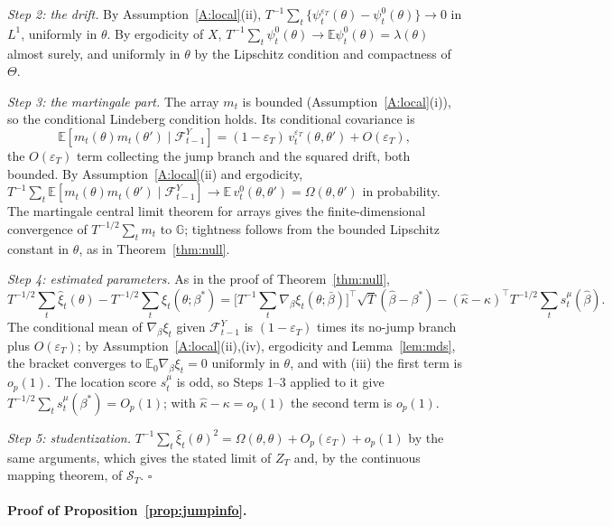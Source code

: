 \documentclass[11pt,a4paper]{article}
\theoremstyle{definition}
\theoremstyle{remark}
\newcommand{\E}{\mathbb{E}}
\newcommand{\F}{\mathcal{F}}
\newcommand{\tr}{^{\top}}
\begin{document}
\emph{Step 2: the drift.} By Assumption~\ref{A:local}(ii), $T^{-1}\sum_t\{\psi^{\varepsilon_T}_t(\theta)-\psi^0_t(\theta)\}\to0$ in $L^1$, uniformly in $\theta$. By ergodicity of $X$, $T^{-1}\sum_t\psi^0_t(\theta)\to\E\psi^0_t(\theta)=\lambda(\theta)$ almost surely, and uniformly in $\theta$ by the Lipschitz condition and compactness of $\Theta$.

\emph{Step 3: the martingale part.} The array $m_t$ is bounded (Assumption~\ref{A:local}(i)), so the conditional Lindeberg condition holds. Its conditional covariance is
\[
\E[m_t(\theta)m_t(\theta')\mid\F^Y_{t-1}]=(1-\varepsilon_T)\,v^{\varepsilon_T}_t(\theta,\theta')+O(\varepsilon_T),
\]
the $O(\varepsilon_T)$ term collecting the jump branch and the squared drift, both bounded. By Assumption~\ref{A:local}(ii) and ergodicity, $T^{-1}\sum_t\E[m_t(\theta)m_t(\theta')\mid\F^Y_{t-1}]\to\E\,v^0_t(\theta,\theta')=\Omega(\theta,\theta')$ in probability. The martingale central limit theorem for arrays \citep[Corollary~3.1]{hall1980} gives the finite-dimensional convergence of $T^{-1/2}\sum_tm_t$ to $\mathbb G$; tightness follows from the bounded Lipschitz constant in $\theta$, as in Theorem~\ref{thm:null}.

\emph{Step 4: estimated parameters.} As in the proof of Theorem~\ref{thm:null},
\[
T^{-1/2}\sum_t\hat\xi_t(\theta)-T^{-1/2}\sum_t\xi_t(\theta;\beta^*)=\Big[T^{-1}\sum_t\nabla_\beta\xi_t(\theta;\bar\beta)\Big]\tr\sqrt T(\hat\beta-\beta^*)-(\hat\kappa-\kappa)\tr T^{-1/2}\sum_ts^\mu_t(\hat\beta).
\]
The conditional mean of $\nabla_\beta\xi_t$ given $\F^Y_{t-1}$ is $(1-\varepsilon_T)$ times its no-jump branch plus $O(\varepsilon_T)$; by Assumption~\ref{A:local}(ii),(iv), ergodicity and Lemma~\ref{lem:mds}, the bracket converges to $\E_0\nabla_\beta\xi_t=0$ uniformly in $\theta$, and with (iii) the first term is $o_p(1)$. The location score $s^\mu_t$ is odd, so Steps 1--3 applied to it give $T^{-1/2}\sum_ts^\mu_t(\beta^*)=O_p(1)$; with $\hat\kappa-\kappa=o_p(1)$ the second term is $o_p(1)$.

\emph{Step 5: studentization.} $T^{-1}\sum_t\hat\xi_t(\theta)^2=\Omega(\theta,\theta)+O_p(\varepsilon_T)+o_p(1)$ by the same arguments, which gives the stated limit of $Z_T$ and, by the continuous mapping theorem, of $\mathcal S_T$.
\hfill$\square$

\paragraph{Proof of Proposition~\ref{prop:jumpinfo}.}
\end{document}
